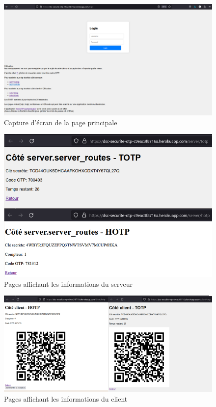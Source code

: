 \documentclass[a4paper, 10pt]{article}
\begin{document}
\begin{figure}[H]
        \centering
        \includegraphics[scale=0.4]{img/C_proto/home.png}
        \caption{Capture d'écran de la page principale\\}
        \label{fig:home}
\end{figure}


\begin{figure}[H]
        \centering
        \includegraphics[scale=1]{img/C_proto/server.png}
        \caption{Pages affichant les informations du serveur\\}
        \label{fig:proto-server}
\end{figure}


\begin{figure}[H]
        \centering
        \includegraphics[scale=1]{img/C_proto/client.png}
        \caption{Pages affichant les informations du client\\}
        \label{fig:proto-client}
\end{figure}
\end{document}
